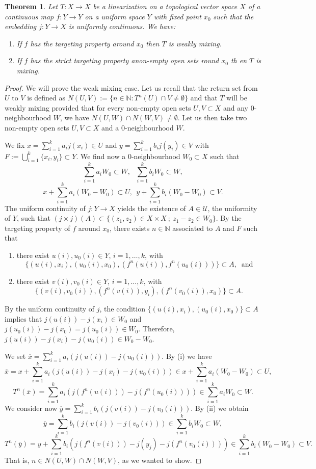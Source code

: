 \documentclass[12pt,english]{amsart}
\numberwithin{equation}{section}
\theoremstyle{plain}
\newtheorem{theorem}{Theorem}[section]
\theoremstyle{definition}
\newcommand{\N}{\mathbb{N}}
\def\NN{\mathbb N}
\renewcommand{\bar}{\overline}
\begin{document}
\begin{theorem}  \label{thm:aim-WHC}
Let $T\colon X\to X$ be a linearization on a topological vector space $X$ of a continuous map $f\colon Y\to Y$ on a uniform space $Y$ with fixed point $x_0$ such that the embedding $j\colon Y\to X$ is uniformly continuous. We have: 
\begin{enumerate}
    \item If $f$ has the targeting property around $x_0$ then $T$ is weakly mixing.
    \item If $f$ has the strict targeting property anon-empty open sets round $x_0$ th en $T$ is mixing.
\end{enumerate}
\end{theorem}
\begin{proof}
We will prove the weak mixing case. Let us recall that the return set from $U$ to $V$ is defined as $N(U,V):=\{n\in\N:T^n(U)\cap V\neq \emptyset\}$ and that $T$ will be weakly mixing provided that for every non-empty open sets $U,V\subset X$ and any $0$-neighbourhood $W$, we have $N(U,W)\cap N(W,V)\neq \emptyset$. Let us then take two non-empty open sets $U,V\subset X$ and a $0$-neighbourhood $W$.

We fix $x=\sum_{i=1}^ka_ij(x_i)\in U$ and $y=\sum_{i=1}^k b_ij(y_i)\in V$ with $F:=\bigcup_{i=1}^k\{x_i,y_i\}\subset Y$. We find now a $0$-neighbourhood $W_0\subset X$ such that 
\[
\sum_{i=1}^ka_i W_0\subset W, \ \ \ \sum_{i=1}^kb_i W_0\subset W,
\]
\[
x+\sum_{i=1}^ka_i (W_0-W_0)\subset U, \ \ y+\sum_{i=1}^kb_i (W_0-W_0)\subset V. 
\]
The uniform continuity of $j\colon Y\to X$ yields the existence of $A\in \mathcal{U}$, the uniformity of $Y$, such that $(j\times j)(A)\subset \{(z_1,z_2)\in X\times X \ ; \ z_1-z_2\in W_0\}$. By the targeting property of $f$ around $x_0$, there exists $n\in\NN$ associated to $A$ and $F$ such that 
\begin{enumerate}
\item[(i)]  there exist $u(i),u_0(i)\in Y$, $i=1, \dots,k$, with 
\[
\{(u(i),x_i),(u_0(i),x_0),(f^n(u(i)),f^n(u_0(i)))\} \subset A, \ \mbox{ and}
\]
\item[(ii)] there exist $v(i),v_0(i)\in Y$, $i=1, \dots,k$, with 
\[
\{(v(i),v_0(i)),(f^n(v(i)),y_i),(f^n(v_0(i)),x_0)\} \subset A. 
\]
\end{enumerate}
By the uniform continuity of $j$, the condition $\{(u(i),x_i),(u_0(i),x_0)\}\subset A$ implies that $j(u(i))-j(x_i)\in W_0$ and $j(u_0(i))-j(x_0)=j(u_0(i))\in W_0$. Therefore, $j(u(i))-j(x_i)-j(u_0(i))\in W_0-W_0$.

We set $\bar{x}=\sum_{i=1}^ka_i (j(u(i))-j(u_0(i)))$. By (i) we have 
\[
\bar{x}=x+\sum_{i=1}^ka_i (j(u(i))-j(x_i)-j(u_0(i)))\in x+\sum_{i=1}^ka_i (W_0-W_0)\subset U, 
\]
\[
T^n(\bar{x})=\sum_{i=1}^ka_i (j(f^n(u(i)))-j(f^n(u_0(i))))\in \sum_{i=1}^ka_i W_0\subset W. 
\]
We consider now $\bar{y}=\sum_{i=1}^kb_i (j(v(i))-j(v_0(i)))$. By (ii) we obtain
\[
\bar{y}=\sum_{i=1}^kb_i (j(v(i))-j(v_0(i)))\in \sum_{i=1}^kb_i W_0\subset W, 
\]
\[
T^n(\bar{y})=y+\sum_{i=1}^kb_i (j(f^n(v(i)))-j(y_j)-j(f^n(v_0(i))))\in \sum_{i=1}^kb_i (W_0-W_0)\subset V. 
\]
That is, $n\in N(U,W)\cap N(W,V)$, as we wanted to show. 
\end{proof}
\end{document}
